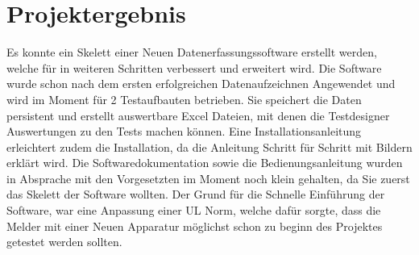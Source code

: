 \documentclass[10pt]{scrartcl}
\begin{document}
\section{Projektergebnis}
Es konnte ein Skelett einer Neuen Datenerfassungssoftware erstellt werden, welche für in weiteren Schritten verbessert und erweitert wird. Die Software wurde schon nach dem ersten erfolgreichen Datenaufzeichnen Angewendet und wird im Moment für 2 Testaufbauten betrieben. Sie speichert die Daten persistent und erstellt auswertbare Excel Dateien, mit denen die Testdesigner Auswertungen zu den Tests machen können.
Eine Installationsanleitung erleichtert zudem die Installation, da die Anleitung Schritt für Schritt mit Bildern erklärt wird.
Die Softwaredokumentation sowie die Bedienungsanleitung wurden in Absprache mit den Vorgesetzten im Moment noch klein gehalten, da Sie zuerst das Skelett der Software wollten. Der Grund für die Schnelle Einführung der Software, war eine Anpassung einer UL Norm, welche dafür sorgte, dass die Melder mit einer Neuen Apparatur möglichst schon zu beginn des Projektes getestet werden sollten.
\end{document}
